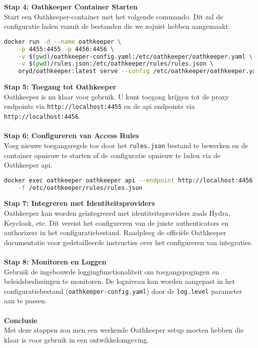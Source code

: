 \textbf{Stap 4: Oathkeeper Container Starten}\\
Start een Oathkeeper-container met het volgende commando. Dit zal de configuratie laden vanuit de bestanden die we zojuist hebben aangemaakt.
\begin{lstlisting}[language=bash]
docker run -d --name oathkeeper \
    -p 4455:4455 -p 4456:4456 \
    -v $(pwd)/oathkeeper-config.yaml:/etc/oathkeeper/oathkeeper.yaml \
    -v $(pwd)/rules.json:/etc/oathkeeper/rules/rules.json \
    oryd/oathkeeper:latest serve --config /etc/oathkeeper/oathkeeper.yaml
\end{lstlisting}
\textbf{Stap 5: Toegang tot Oathkeeper}\\
Oathkeeper is nu klaar voor gebruik. U kunt toegang krijgen tot de proxy endpoints via \texttt{http://localhost:4455} en de \gls{api} endpoints via \texttt{http://localhost:4456}.\\\\
\textbf{Stap 6: Configureren van Access Rules}\\
Voeg nieuwe toegangsregels toe door het \texttt{rules.json} bestand te bewerken en de container opnieuw te starten of de configuratie opnieuw te laden via de Oathkeeper \gls{api}.\@
\begin{lstlisting}[language=bash]
docker exec oathkeeper oathkeeper api --endpoint http://localhost:4456 rules create \
    -f /etc/oathkeeper/rules/rules.json
\end{lstlisting}
\textbf{Stap 7: Integreren met Identiteitsproviders}\\
Oathkeeper kan worden geïntegreerd met identiteitsproviders zoals Hydra, Keycloak, etc. Dit vereist het configureren van de juiste authenticators en authorizers in het configuratiebestand. Raadpleeg de officiële Oathkeeper documentatie voor gedetailleerde instructies over het configureren van integraties.\\\\
\textbf{Stap 8: Monitoren en Loggen}\\
Gebruik de ingebouwde loggingfunctionaliteit om toegangspogingen en beleidsbeslissingen te monitoren. De logniveau kan worden aangepast in het configuratiebestand (\texttt{oathkeeper-config.yaml}) door de \texttt{log.level} parameter aan te passen.\\\\
\textbf{Conclusie}\\
Met deze stappen zou men een werkende Oathkeeper setup moeten hebben die klaar is voor gebruik in een ontwikkelomgeving.


